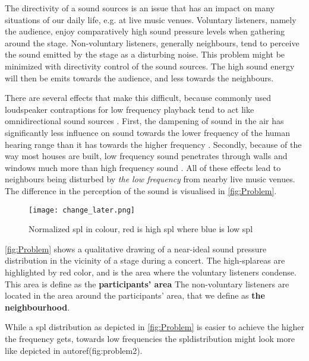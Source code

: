 
The directivity of a sound sources is an issue that has an impact on many situations of our daily life, e.g. at live music venues. Voluntary listeners, namely the audience, enjoy comparatively high sound pressure levels when gathering around the stage. Non-voluntary listeners, generally neighbours, tend to perceive the sound emitted by the stage as a disturbing noise. This problem might be minimized with directivity control of the sound sources. The high sound energy will then be emits towards the audience, and less towards the neighbours. 


There are several effects that make this difficult, because commonly used loudspeaker contraptions for low frequency playback tend to act like omnidirectional sound sources \citep[p. 1391 f.]{crocker98}.  First, the dampening of sound in the air has significantly less influence on sound towards the lower frequency of the human hearing range than it has towards the higher frequency \citep[p. 240]{Möser2009}. Secondly, because of the way most houses are built, low frequency sound penetrates through walls and windows much more than high frequency sound \citep[p. 240 ff.]{Möser2009}. All of these effects lead to neighbours being disturbed by \textit{the low frequency} from nearby live music venues.\\
The difference in the perception of the sound is visualised in \autoref{fig:Problem}.


\begin{figure}[htbp]
	\centering
	\texttt{[image: change\_later.png]}
	\caption{Normalized \gls{spl} in colour, red is high \gls{spl} where blue is low \gls{spl}}
		\label{fig:Problem}
\end{figure}

\autoref{fig:Problem} shows a qualitative drawing of a near-ideal sound pressure distribution in the vicinity of a stage during a concert. The high-\gls{spl}areas are highlighted by red color, and is the area where the voluntary listeners condense. This area is define as the \textbf{participants' area} The non-voluntary listeners are located in the area around the participants' area, that we define as \textbf{the neighbourhood}. 

While a \gls{spl} distribution as depicted in \autoref{fig:Problem} is easier to achieve the higher the frequency gets, towards low frequencies the \gls{spl}distribution might look more like depicted in autoref(fig:problem2).



